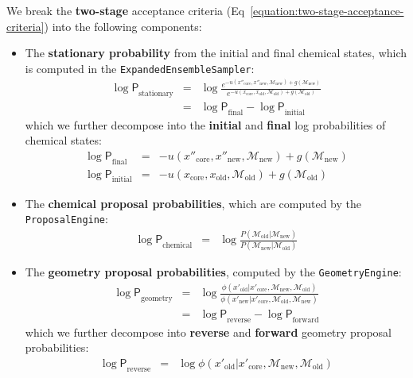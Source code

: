 \documentclass[aps,pre,twocolumn,nofootinbib,superscriptaddress,linenumbers,11point]{revtex4-1}
\newcommand{\logP}{{\log \mathsf{P}}}
\begin{document}
We break the {\bf two-stage} acceptance criteria (Eq~\ref{equation:two-stage-acceptance-criteria}) into the following components:
\begin{itemize}
\item The {\bf stationary probability} from the initial and final chemical states, which is computed in the {\tt ExpandedEnsembleSampler}:
\begin{eqnarray}
\logP_\mathrm{stationary} &=& \log \frac{e^{-u(x''_\mathrm{core}, x''_\mathrm{new}, \mathcal{M}_\mathrm{new}) + g(\mathcal{M}_\mathrm{new})}}{e^{-u(x_\mathrm{core}, x_\mathrm{old}, \mathcal{M}_\mathrm{old}) + g(\mathcal{M}_\mathrm{old})}} \label{equation:two-stage-stationary} \\
&=& \logP_\mathrm{final} - \logP_\mathrm{initial}
\end{eqnarray}
which we further decompose into the {\bf initial} and {\bf final} log probabilities of chemical states:
\begin{eqnarray}
\logP_\mathrm{final} &=& -u(x''_\mathrm{core}, x''_\mathrm{new}, \mathcal{M}_\mathrm{new}) + g(\mathcal{M}_\mathrm{new}) \\
\logP_\mathrm{initial} &=& -u(x_\mathrm{core}, x_\mathrm{old}, \mathcal{M}_\mathrm{old}) + g(\mathcal{M}_\mathrm{old})
\end{eqnarray}
\item The {\bf chemical proposal probabilities}, which are computed by the {\tt ProposalEngine}:
\begin{eqnarray}
\logP_\mathrm{chemical} &=& \log \frac{P(\mathcal{M}_\mathrm{old} | \mathcal{M}_\mathrm{new})}{P(\mathcal{M}_\mathrm{new} | \mathcal{M}_\mathrm{old})} \label{equation:two-stage-chemical-state-proposal}
\end{eqnarray}
\item The {\bf geometry proposal probabilities}, computed by the {\tt GeometryEngine}:
\begin{eqnarray}
\logP_\mathrm{geometry} &=& \log \frac{\phi(x'_\mathrm{old} | x'_\mathrm{core}, \mathcal{M}_\mathrm{new}, \mathcal{M}_\mathrm{old})}{\phi(x'_\mathrm{new} | x'_\mathrm{core}, \mathcal{M}_\mathrm{old}, \mathcal{M}_\mathrm{new})} \label{equation:two-stage-geometry} \\
&=& \logP_\mathrm{reverse} - \logP_\mathrm{forward}
\end{eqnarray}
which we further decompose into {\bf reverse} and {\bf forward} geometry proposal probabilities:
\begin{eqnarray}
\logP_\mathrm{reverse} &=& \log \phi(x'_\mathrm{old} | x'_\mathrm{core}, \mathcal{M}_\mathrm{new}, \mathcal{M}_\mathrm{old}) \\

\end{eqnarray}
\end{itemize}
\end{document}
